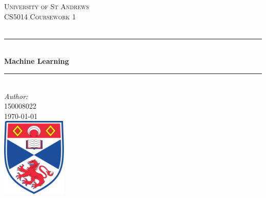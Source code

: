 \documentclass[12pt]{article}
\begin{document}
\begin{titlepage}

\newcommand{\HRule}{\rule{\linewidth}{0.5mm}} %

\center %
 

\textsc{\LARGE University of St Andrews}\\[1.5cm] %
\textsc{\Large CS5014 Coursework 1}\\[0.5cm] %
\textsc{\large }\\[0.5cm] %


\HRule \\[0.4cm]
{ \huge \bfseries Machine Learning}\\[0.4cm] %
\HRule \\[1.5cm]
 


\Large \emph{Author:}\\
 \textsc{150008022}\\[3cm] %


{\large \today}\\[2cm] %


\includegraphics[width = 3.1cm]{images/standrewslogo.png}
 

\vfill %

\end{titlepage}
\end{document}
